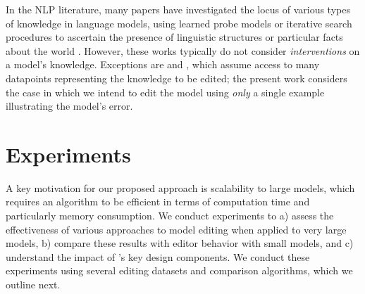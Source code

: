 \documentclass{article}
\begin{document}
In the NLP literature, many papers have investigated the locus of various types of knowledge in language models, using learned probe models or iterative search procedures to ascertain the presence of linguistic structures \citep{belinkov-etal-2017-neural,conneau-etal-2018-cram,hewitt-manning-2019-structural} or particular facts about the world \cite{petroni-etal-2019-language,Jiang2020HowCW,dai2021knowledge}. However, these works typically do not consider \textit{interventions} on a model's knowledge. Exceptions are \cite{dai2021knowledge} and \cite{wang2020kadapter}, which assume access to many datapoints representing the knowledge to be edited; the present work considers the case in which we intend to edit the model using \textit{only} a single example illustrating the model's error.

\section{Experiments}


A key motivation for our proposed approach is scalability to large models, which requires an algorithm to be efficient in terms of computation time and particularly memory consumption. We conduct experiments to a) assess the effectiveness of various approaches to model editing when applied to very large models, b) compare these results with editor behavior with small models, and c) understand the impact of \name's key design components. We conduct these experiments using several editing datasets and comparison algorithms, which we outline next.
\end{document}
